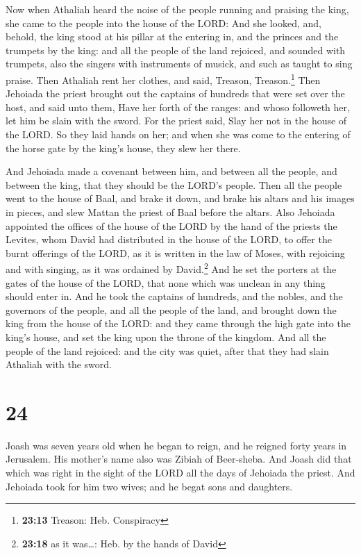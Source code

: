  Now when Athaliah heard the noise of the people running
and praising the king, she came to the people into the house of the
LORD:  And she looked, and, behold, the king stood at his
pillar at the entering in, and the princes and the trumpets by the king:
and all the people of the land rejoiced, and sounded with trumpets, also
the singers with instruments of musick, and such as taught to sing
praise. Then Athaliah rent her clothes, and said, Treason,
Treason.\footnote{\textbf{23:13} Treason: Heb. Conspiracy}
 Then Jehoiada the priest brought out the captains of
hundreds that were set over the host, and said unto them, Have her forth
of the ranges: and whoso followeth her, let him be slain with the sword.
For the priest said, Slay her not in the house of the LORD.
 So they laid hands on her; and when she was come to the
entering of the horse gate by the king's house, they slew her there.

 And Jehoiada made a covenant between him, and between
all the people, and between the king, that they should be the LORD's
people.  Then all the people went to the house of Baal,
and brake it down, and brake his altars and his images in pieces, and
slew Mattan the priest of Baal before the altars.  Also
Jehoiada appointed the offices of the house of the LORD by the hand of
the priests the Levites, whom David had distributed in the house of the
LORD, to offer the burnt offerings of the LORD, as it is written in the
law of Moses, with rejoicing and with singing, as it was ordained by
David.\footnote{\textbf{23:18} as it was\ldots: Heb. by the hands of
  David}  And he set the porters at the gates of the
house of the LORD, that none which was unclean in any thing should enter
in.  And he took the captains of hundreds, and the
nobles, and the governors of the people, and all the people of the land,
and brought down the king from the house of the LORD: and they came
through the high gate into the king's house, and set the king upon the
throne of the kingdom.  And all the people of the land
rejoiced: and the city was quiet, after that they had slain Athaliah
with the sword.

\hypertarget{section-23}{%
\section{24}\label{section-23}}

 Joash was seven years old when he began to reign, and he
reigned forty years in Jerusalem. His mother's name also was Zibiah of
Beer-sheba.  And Joash did that which was right in the
sight of the LORD all the days of Jehoiada the priest. 
And Jehoiada took for him two wives; and he begat sons and daughters.


